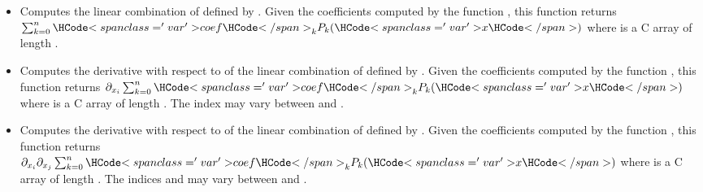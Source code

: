 \begin{itemize}
\item {}
  \sshortdescribe Computes the linear combination of  defined by
  . Given the coefficients computed by the function
  , this function returns $\sum_{k=0}^n
  \var{coef}_k  P_k(\var{x})$ where  is a C array of length
  .

\item {}
  \sshortdescribe Computes the derivative with respect to  of the
  linear combination of  defined by . Given the
  coefficients computed by the function , this
  function returns $\partial_{x_i} \sum_{k=0}^n \var{coef}_k  P_k(\var{x})$
  where  is a C array of length . The index 
  may vary between  and .


\item {}
  \sshortdescribe Computes the derivative with respect to  of the
  linear combination of  defined by . Given the
  coefficients computed by the function , this
  function returns $\partial_{x_i} \partial_{x_j} \sum_{k=0}^n \var{coef}_k  P_k(\var{x})$
  where  is a C array of length . The indices 
  and  may vary between  and .


\end{itemize}

